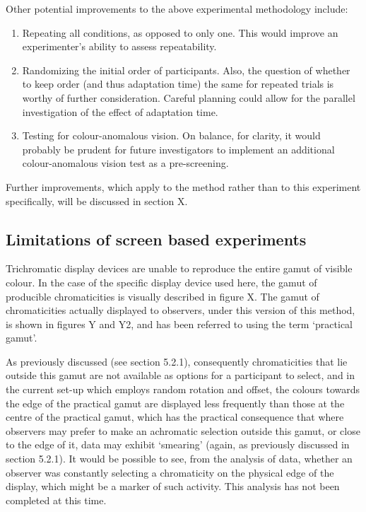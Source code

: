 Other potential improvements to the above experimental methodology include:

\begin{enumerate}
    \item Repeating all conditions, as opposed to only one. This would improve an experimenter's ability to assess repeatability.
    \item Randomizing the initial order of participants. Also, the question of whether to keep order (and thus adaptation time) the same for repeated trials is worthy of further consideration. Careful planning could allow for the parallel investigation of the effect of adaptation time.
    \item Testing for colour-anomalous vision. On balance, for clarity, it would probably be prudent for future investigators to implement an additional colour-anomalous vision test as a pre-screening.
\end{enumerate}

Further improvements, which apply to the method rather than to this experiment specifically, will be discussed in section X.%

\subsection{Limitations of screen based experiments}

Trichromatic display devices are unable to reproduce the entire gamut of visible colour. In the case of the specific display device used here, the gamut of producible chromaticities is visually described in figure X. The gamut of chromaticities actually displayed to observers, under this version of this method, is shown in figures Y and Y2, and has been referred to using the term `practical gamut'.

As previously discussed (see section 5.2.1), consequently chromaticities that lie outside this gamut are not available as options for a participant to select, and in the current set-up which employs random rotation and offset, the colours towards the edge of the practical gamut are displayed less frequently than those at the centre of the practical gamut, which has the practical consequence that where observers may prefer to make an achromatic selection outside this gamut, or close to the edge of it, data may exhibit `smearing' (again, as previously discussed in section 5.2.1). It would be possible to see, from the analysis of data, whether an observer was constantly selecting a chromaticity on the physical edge of the display, which might be a marker of such activity. This analysis has not been completed at this time.

